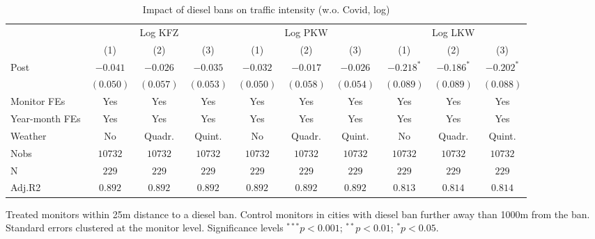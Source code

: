 
\begin{table}[h]
\caption{Impact of diesel bans on traffic intensity (w.o. Covid, log)}
\begin{center}
\begin{footnotesize}
\begin{threeparttable}
\begin{tabular}{l c c c c c c c c c}
\toprule
& \multicolumn{3}{c}{Log KFZ } & \multicolumn{3}{c}{Log PKW }  & \multicolumn{3}{c}{Log LKW } \\ \cmidrule(r){2-4} \cmidrule(r){5-7} \cmidrule(r){8-10}
 & (1) & (2) & (3) & (1) & (2) & (3) & (1) & (2) & (3) \\
\midrule
Post   & $-0.041$  & $-0.026$  & $-0.035$  & $-0.032$  & $-0.017$  & $-0.026$  & $-0.218^{*}$ & $-0.186^{*}$ & $-0.202^{*}$ \\
       & $(0.050)$ & $(0.057)$ & $(0.053)$ & $(0.050)$ & $(0.058)$ & $(0.054)$ & $(0.089)$    & $(0.089)$    & $(0.088)$    \\
\midrule
Monitor FEs   & Yes & Yes & Yes  & Yes & Yes & Yes & Yes & Yes & Yes    \\
Year-month FEs     & Yes & Yes & Yes  & Yes & Yes & Yes & Yes & Yes & Yes  \\
Weather     & No & Quadr. & Quint.  & No & Quadr. & Quint. & No & Quadr. & Quint.   \\ \midrule
Nobs   & $10732$   & $10732$   & $10732$   & $10732$   & $10732$   & $10732$   & $10732$      & $10732$      & $10732$      \\
N      & $229$     & $229$     & $229$     & $229$     & $229$     & $229$     & $229$        & $229$        & $229$        \\
Adj.R2 & $0.892$   & $0.892$   & $0.892$   & $0.892$   & $0.892$   & $0.892$   & $0.813$      & $0.814$      & $0.814$      \\
\bottomrule
\end{tabular}
\begin{tablenotes}[flushleft]
\tiny{\item Treated monitors within 25m distance to a diesel ban. 
       Control monitors in cities with diesel ban further away than 1000m from the ban. 
       Standard errors clustered at the monitor level.
       Significance levels $^{***}p<0.001$; $^{**}p<0.01$; $^{*}p<0.05$.}
\end{tablenotes}
\end{threeparttable}
\end{footnotesize}
\label{table:coefficients}
\end{center}
\end{table}

